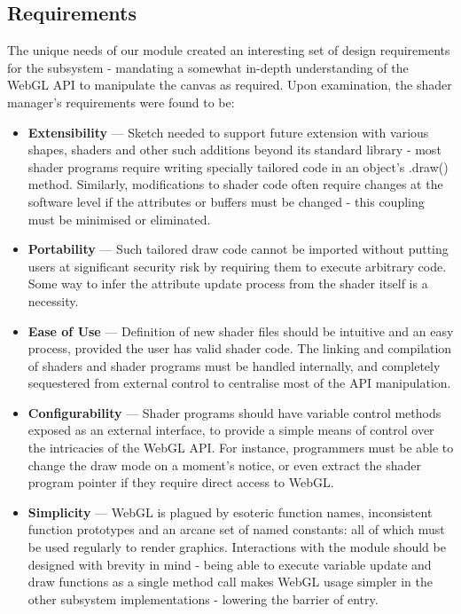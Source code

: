 \documentclass{l3proj}
\begin{document}
\subsection{Requirements}
\label{arch-shad-req}
The unique needs of our module created an interesting set of design requirements for the subsystem - mandating a somewhat in-depth understanding of the WebGL API to manipulate the canvas as required. Upon examination, the shader manager's requirements were found to be:
\begin{itemize}
\item \textbf{Extensibility} --- Sketch needed to support future extension with various shapes, shaders and other such additions beyond its standard library - most shader programs require writing specially tailored code in an object's .draw() method. Similarly, modifications to shader code often require changes at the software level if the attributes or buffers must be changed - this coupling must be minimised or eliminated.
\item \textbf{Portability} --- Such tailored draw code cannot be imported without putting users at significant security risk by requiring them to execute arbitrary code. Some way to infer the attribute update process from the shader itself is a necessity.
\item \textbf{Ease of Use} --- Definition of new shader files should be intuitive and an easy process, provided the user has valid shader code. The linking and compilation of shaders and shader programs must be handled internally, and completely sequestered from external control to centralise most of the API manipulation.
\item \textbf{Configurability} --- Shader programs should have variable control methods exposed as an external interface, to provide a simple means of control over the intricacies of the WebGL API. For instance, programmers must be able to change the draw mode on a moment's notice, or even extract the shader program pointer if they require direct access to WebGL.
\item \textbf{Simplicity} --- WebGL is plagued by esoteric function names, inconsistent function prototypes and an arcane set of named constants: all of which must be used regularly to render graphics. Interactions with the module should be designed with brevity in mind - being able to execute variable update and draw functions as a single method call makes WebGL usage simpler in the other subsystem implementations - lowering the barrier of entry.
\end{itemize}
\end{document}
